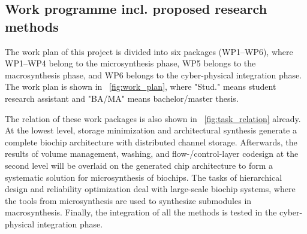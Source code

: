 
\vskip 20pt
\subsection{Work programme incl. proposed research methods}

The work plan of this project is divided into six packages (WP1--WP6),
where WP1--WP4 belong to the microsynthesis phase, WP5 belongs to the
macrosynthesis phase, and WP6 belongs to the cyber-physical integration phase.
The work plan is shown in \figname~\ref{fig:work_plan}, where "Stud." means student research
assistant and "BA/MA" means bachelor/master thesis.


\begin{figure*}[h]
{
\figurefontsize
\centering

\caption{Work plan and work packages.} 
\label{fig:work_plan}
}
\end{figure*}

The relation of these work packages is also shown in
\figname~\ref{fig:task_relation} already. At the lowest level, storage minimization and
architectural synthesis generate a complete biochip architecture with
distributed channel storage. 
Afterwards, the results of volume management, 
washing, and flow-/control-layer codesign at the second level 
will be overlaid on the generated chip architecture %
to form a systematic solution for microsynthesis of biochips. 
The tasks of hierarchical design and reliability
optimization deal with large-scale biochip systems, where the
tools from microsynthesis are used to synthesize submodules in
macrosynthesis. Finally, the integration of all the methods is tested in the
cyber-physical integration phase.


